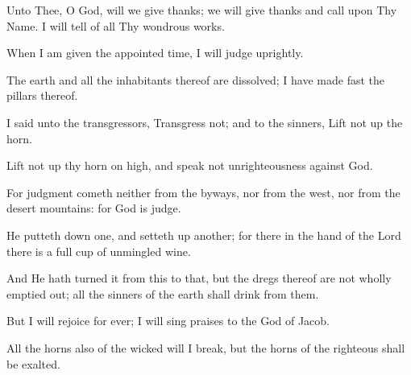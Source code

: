Unto Thee, O God, will we give thanks; we will give thanks and call upon Thy Name. I will tell of all Thy wondrous works.

When I am given the appointed time, I will judge uprightly.

The earth and all the inhabitants thereof are dissolved; I have made fast the pillars thereof.

I said unto the transgressors, Transgress not; and to the sinners, Lift not up the horn.

Lift not up thy horn on high, and speak not unrighteousness against God.

For judgment cometh neither from the byways, nor from the west, nor from the desert mountains: for God is judge.

He putteth down one, and setteth up another; for there in the hand of the Lord there is a full cup of unmingled wine.

And He hath turned it from this to that, but the dregs thereof are not wholly emptied out; all the sinners of the earth shall drink from them.

But I will rejoice for ever; I will sing praises to the God of Jacob.

All the horns also of the wicked will I break, but the horns of the righteous shall be exalted.

